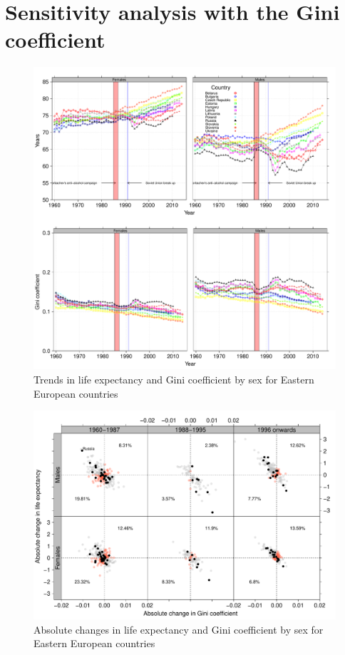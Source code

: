 \documentclass{article}
\begin{document}
\newpage
\section*{Sensitivity analysis with the Gini coefficient}

\begin{figure}[h!]
\caption{Trends in life expectancy and Gini coefficient by sex for Eastern European countries}
\centering
\begin{center}
\includegraphics[scale=.4]{Figures/F1_SS}
\end{center}
\end{figure}

\newpage

\begin{figure}[h!]
\caption{Absolute changes in life expectancy and Gini coefficient by sex for Eastern European countries}
\centering
\begin{center}
\includegraphics[scale=.4]{Figures/F2_SS}
\end{center}
\end{figure}
\end{document}
